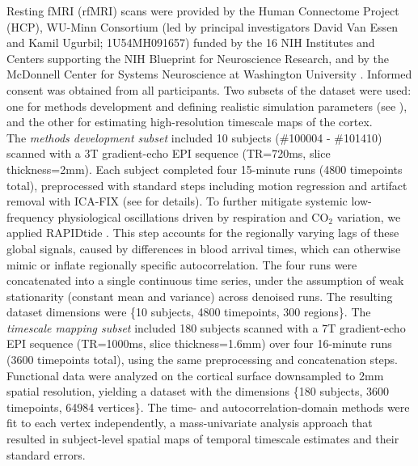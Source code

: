 \documentclass[9pt]{article}
\begin{document}
Resting fMRI (rfMRI) scans were provided by the Human Connectome Project (HCP), WU-Minn Consortium (led by principal investigators David Van Essen and Kamil Ugurbil; 1U54MH091657) funded by the 16 NIH Institutes and Centers supporting the NIH Blueprint for Neuroscience Research, and by the McDonnell Center for Systems Neuroscience at Washington University \citep{van_essen_wu-minn_2013}. Informed consent was obtained from all participants. Two subsets of the dataset were used: one for methods development and defining realistic simulation parameters (see ), and the other for estimating high-resolution timescale maps of the cortex.\\

The \textit{methods development subset} included 10 subjects  (\#100004 - \#101410) scanned with a 3T gradient-echo EPI sequence (TR=720ms, slice thickness=2mm). Each subject completed four 15-minute runs (4800 timepoints total), preprocessed with standard steps including motion regression and artifact removal with ICA-FIX (see \citet{glasser_minimal_2013, salimi-khorshidi_automatic_2014} for details). To further mitigate systemic low-frequency physiological oscillations driven by respiration and $\text{CO}_2$ variation, we applied RAPIDtide \citep{frederick_rapidtide_2025}. This step accounts for the regionally varying lags of these global signals, caused by differences in blood arrival times, which can otherwise mimic or inflate regionally specific autocorrelation. The four runs were concatenated into a single continuous time series, under the assumption of weak stationarity (constant mean and variance) across denoised runs. The resulting dataset dimensions were \{10 subjects, 4800 timepoints, 300 regions\}. The \textit{timescale mapping subset} included 180 subjects scanned with a 7T gradient-echo EPI sequence (TR=1000ms, slice thickness=1.6mm) over four 16-minute runs (3600 timepoints total), using the same preprocessing and concatenation steps. Functional data were analyzed on the cortical surface downsampled to 2mm spatial resolution, yielding a dataset with the dimensions \{180 subjects, 3600 timepoints, 64984 vertices\}. The time- and autocorrelation-domain methods were fit to each vertex independently, a mass-univariate analysis approach that resulted in subject-level spatial maps of temporal timescale estimates and their standard errors.\\
\end{document}
